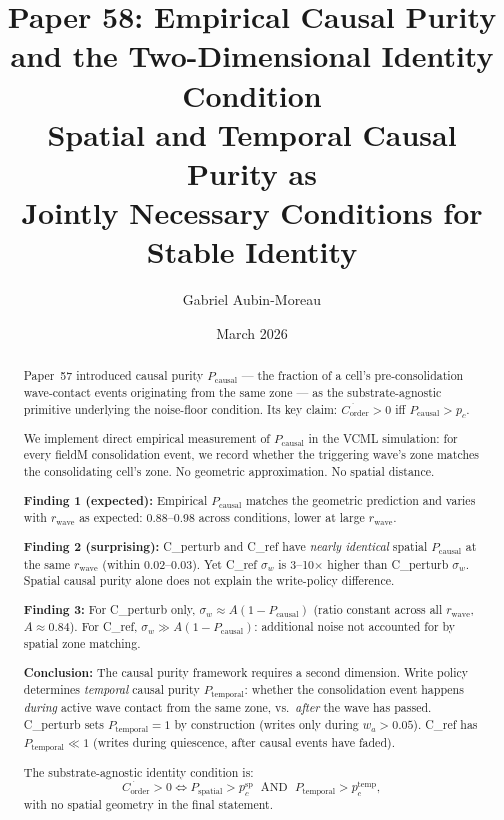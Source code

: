 \documentclass[11pt,a4paper]{article}
\title{\textbf{Paper 58: Empirical Causal Purity and the Two-Dimensional Identity Condition}\\
\large Spatial and Temporal Causal Purity as\\
Jointly Necessary Conditions for Stable Identity}
\author[1]{Gabriel Aubin-Moreau}
\affil[1]{Independent research}
\date{March 2026}
\newcommand{\Corder}{C_{\mathrm{order}}}
\newcommand{\Pcausal}{P_{\mathrm{causal}}}
\newcommand{\Psp}{P_{\mathrm{spatial}}}
\newcommand{\Ptemp}{P_{\mathrm{temporal}}}
\begin{document}
\maketitle

\begin{abstract}
Paper~57 introduced causal purity $\Pcausal$ --- the fraction of a cell's
pre-consolidation wave-contact events originating from the same zone --- as
the substrate-agnostic primitive underlying the noise-floor condition.
Its key claim: $\dot{\Corder}>0$ iff $\Pcausal > p_c$.

We implement direct empirical measurement of $\Pcausal$ in the VCML simulation:
for every fieldM consolidation event, we record whether the triggering wave's zone
matches the consolidating cell's zone.
No geometric approximation. No spatial distance.

\textbf{Finding 1 (expected):}
Empirical $\Pcausal$ matches the geometric prediction and varies with $r_\mathrm{wave}$
as expected: 0.88--0.98 across conditions, lower at large $r_\mathrm{wave}$.

\textbf{Finding 2 (surprising):}
C\_perturb and C\_ref have \emph{nearly identical} spatial $\Pcausal$ at the same
$r_\mathrm{wave}$ (within 0.02--0.03).
Yet C\_ref $\sigma_w$ is 3--10$\times$ higher than C\_perturb $\sigma_w$.
Spatial causal purity alone does not explain the write-policy difference.

\textbf{Finding 3:}
For C\_perturb only, $\sigma_w \approx A(1-\Pcausal)$ (ratio constant across
all $r_\mathrm{wave}$, $A \approx 0.84$).
For C\_ref, $\sigma_w \gg A(1-\Pcausal)$: additional noise not accounted for
by spatial zone matching.

\textbf{Conclusion:}
The causal purity framework requires a second dimension.
Write policy determines \emph{temporal} causal purity $\Ptemp$: whether the
consolidation event happens \emph{during} active wave contact from the same zone,
vs.\ \emph{after} the wave has passed.
C\_perturb sets $\Ptemp=1$ by construction (writes only during $w_a>0.05$).
C\_ref has $\Ptemp \ll 1$ (writes during quiescence, after causal events have faded).

The substrate-agnostic identity condition is:
\begin{equation*}
  \dot{\Corder} > 0
  \iff
  \Psp > p_c^\mathrm{sp} \;\text{ AND }\; \Ptemp > p_c^\mathrm{temp},
\end{equation*}
with no spatial geometry in the final statement.
\end{abstract}
\end{document}
